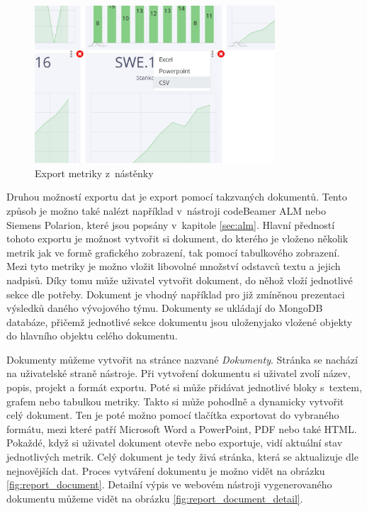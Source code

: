 \documentclass[czech,master]{diploma}
\begin{document}
\begin{figure}[!ht]
    \centering
    \includegraphics[width=0.8\textwidth]{Diplomka/Figures/dashboard_export.jpg}
    \caption{Export metriky z~nástěnky}
    \label{fig:dashboard_export}
\end{figure}

Druhou možností exportu dat je export pomocí takzvaných dokumentů. Tento způsob je možno také nalézt například v~nástroji codeBeamer ALM nebo Siemens Polarion, které jsou popsány v~kapitole \ref{sec:alm}. Hlavní předností tohoto exportu je možnost vytvořit si dokument, do kterého je vloženo několik metrik jak ve formě grafického zobrazení, tak pomocí tabulkového zobrazení. Mezi tyto metriky je možno vložit libovolné množství odstavců textu a jejich nadpisů. Díky tomu může uživatel vytvořit dokument, do něhož vloží jednotlivé sekce dle potřeby. Dokument je vhodný například pro již zmíněnou prezentaci výsledků daného vývojového týmu. Dokumenty se ukládají do MongoDB databáze, přičemž jednotlivé sekce dokumentu jsou uloženyjako vložené objekty do hlavního objektu celého dokumentu.

Dokumenty můžeme vytvořit na stránce nazvané \textit{Dokumenty}. Stránka se nachází na uživatelské straně nástroje. Při vytvoření dokumentu si uživatel zvolí název, popis, projekt a formát exportu. Poté si může přidávat  jednotlivé bloky s~textem, grafem nebo tabulkou metriky. Takto si může pohodlně a dynamicky vytvořit celý dokument. Ten je poté možno pomocí tlačítka exportovat do vybraného formátu, mezi které patří Microsoft Word a PowerPoint, PDF nebo také HTML. Pokaždé, když si uživatel dokument otevře nebo exportuje, vidí aktuální stav jednotlivých metrik. Celý dokument je tedy živá stránka, která se aktualizuje dle nejnovějších dat. Proces vytváření dokumentu je možno vidět na obrázku \ref{fig:report_document}. Detailní výpis ve webovém nástroji vygenerovaného dokumentu můžeme vidět na obrázku \ref{fig:report_document_detail}.
\end{document}
